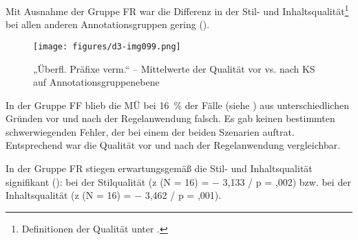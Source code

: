 Mit Ausnahme der Gruppe FR war die Differenz in der Stil- und Inhaltsqualität\footnote{\textrm{Definitionen der Qualität unter .}} bei allen anderen Annotationsgruppen gering ().


\begin{figure}
\texttt{[image: figures/d3-img099.png]}

\caption{\label{fig:05:122}„Überfl. Präfixe verm.“ -- Mittelwerte der Qualität vor vs. nach KS auf Annotationsgruppenebene   }
\end{figure}

In der Gruppe FF blieb die MÜ bei 16~\% der Fälle (siehe ) aus unterschiedlichen Gründen vor und nach der Regelanwendung falsch. Es gab keinen bestimmten schwerwiegenden Fehler, der bei einem der beiden Szenarien auftrat. Entsprechend war die Qualität vor und nach der Regelanwendung vergleichbar.

In der Gruppe FR stiegen erwartungsgemäß die Stil- und Inhaltsqualität signifikant (): bei der Stilqualität (z (N = 16) = $-$ 3,133 / p = ,002) bzw. bei der Inhaltsqualität (z (N = 16) = $-$ 3,462 / p = ,001).


